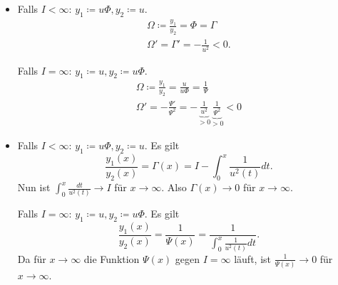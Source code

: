 \documentclass[a4paper, landscape,twocolumn,fontsize=8pt,DIV=1]{scrartcl}
\theoremstyle{plain}
\begin{document}
\begin{enumerate}[label=(\alph*)]
\begin{itemize}
        \item Falls $I < \infty$: $y_1 \coloneqq u\Phi,  y_2 \coloneqq u$.
        \begin{gather*}
            \Omega \coloneqq \frac{y_1}{y_2} = \Phi = \Gamma \\
            \Omega' = \Gamma' = -\frac{1}{u^2}  < 0.
        \end{gather*}
        
        Falls $I = \infty$: $y_1 \coloneqq u,  y_2 \coloneqq u\Phi$.
        \begin{gather*}
            \Omega \coloneqq \frac{y_1}{y_2} = \frac{u}{u\Phi}  = \frac{1}{\Psi} \\
            \Omega' = -\frac{\Psi'}{\Psi^2} = - \underbrace{\frac{1}{u^2}}_{>0} \underbrace{\frac{1}{\Psi^2}}_{>0} < 0
        \end{gather*}
        
        
        \item Falls $I < \infty$: $y_1 \coloneqq u\Phi,  y_2 \coloneqq u$. Es gilt $$\frac{y_1(x)}{y_2(x)} = \Gamma(x) = I - \int^x_0 \frac{1}{u^2(t)}dt.$$ Nun ist $\int^x_0 \frac{dt}{u^2(t)} \to I$ für $x \to \infty$. Also $\Gamma(x)\to 0$ für $x \to \infty$.
        
        Falls $I = \infty$: $y_1 \coloneqq u,  y_2 \coloneqq u\Phi$. Es gilt 
        $$\frac{y_1(x)}{y_2(x)} = \frac{1}{\Psi(x)} = \frac{1}{\int^x_0 \frac{1}{u^2(t)}dt}.$$
        Da für $x \to \infty$ die Funktion $\Psi(x)$ gegen $I = \infty$ läuft, ist $\frac{1}{\Psi(x)} \to 0$ für $x\to \infty$.
    \end{itemize}
\end{enumerate}
\end{document}
